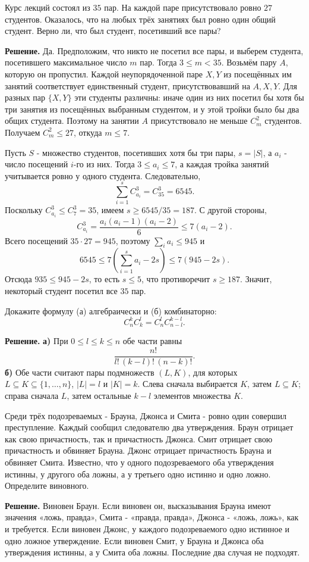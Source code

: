 \begin{problems}
\item Курс лекций состоял из $35$ пар. На каждой паре присутствовало ровно $27$ студентов. Оказалось, что на любых трёх занятиях был ровно один общий студент. Верно ли, что был студент, посетивший все пары?
\par\smallskip\noindent\textbf{Решение.} Да. Предположим, что никто не посетил все пары, и выберем студента, посетившего максимальное число $m$ пар. Тогда $3\le m<35$. Возьмём пару $A$, которую он пропустил. Каждой неупорядоченной паре $X,Y$ из посещённых им занятий соответствует единственный студент, присутствовавший на $A,X,Y$. Для разных пар $\{X,Y\}$ эти студенты различны: иначе один из них посетил бы хотя бы три занятия из посещённых выбранным студентом, и у этой тройки было бы два общих студента. Поэтому на занятии $A$ присутствовало не меньше $C_m^2$ студентов. Получаем $C_m^2\le27$, откуда $m\le7$.
\par Пусть $S$ - множество студентов, посетивших хотя бы три пары, $s=|S|$, а $a_i$ - число посещений $i$-го из них. Тогда $3\le a_i\le7$, а каждая тройка занятий учитывается ровно у одного студента. Следовательно,
\[
\sum_{i=1}^{s}C_{a_i}^{3}=C_{35}^{3}=6545.
\]
Поскольку $C_{a_i}^{3}\le C_7^3=35$, имеем $s\ge6545/35=187$. С другой стороны,
\[
C_{a_i}^{3}=\frac{a_i(a_i-1)(a_i-2)}{6}\le7(a_i-2).
\]
Всего посещений $35\cdot27=945$, поэтому $\sum_i a_i\le945$ и
\[
6545\le7\left(\sum_{i=1}^{s}a_i-2s\right)\le7(945-2s).
\]
Отсюда $935\le945-2s$, то есть $s\le5$, что противоречит $s\ge187$. Значит, некоторый студент посетил все $35$ пар.\par

\item Докажите формулу (а) алгебраически и (б) комбинаторно:
\[
  C_n^k C_k^l = C_n^l C_{n-l}^{k-l}.
\]
\par\smallskip\noindent\textbf{Решение.} \textbf{а)} При $0\le l\le k\le n$ обе части равны
\[
\frac{n!}{l!\,(k-l)!\,(n-k)!}.
\]
\textbf{б)} Обе части считают пары подмножеств $(L,K)$, для которых $L\subseteq K\subseteq\{1,\ldots,n\}$, $|L|=l$ и $|K|=k$. Слева сначала выбирается $K$, затем $L\subseteq K$; справа сначала $L$, затем остальные $k-l$ элементов множества $K$.\par

\item Среди трёх подозреваемых - Брауна, Джонса и Смита - ровно один
совершил преступление. Каждый сообщил следователю два утверждения.
Браун отрицает как свою причастность, так и причастность Джонса.
Смит отрицает свою причастность и обвиняет Брауна.
Джонс отрицает причастность Брауна и обвиняет Смита.
Известно, что у одного подозреваемого оба утверждения истинны,
у другого оба ложны, а у третьего одно истинно и одно ложно.
Определите виновного.
\par\smallskip\noindent\textbf{Решение.} Виновен Браун. Если виновен он, высказывания Брауна имеют значения «ложь, правда», Смита - «правда, правда», Джонса - «ложь, ложь», как и требуется. Если виновен Джонс, у каждого подозреваемого одно истинное и одно ложное утверждение. Если виновен Смит, у Брауна и Джонса оба утверждения истинны, а у Смита оба ложны. Последние два случая не подходят.\par


\end{problems}
